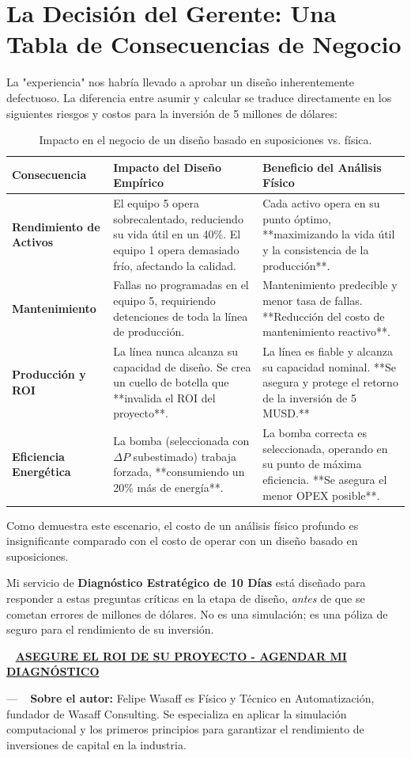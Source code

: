 \documentclass[11pt, a4paper,oneside]{article}
\begin{document}
\section{La Decisión del Gerente: Una Tabla de Consecuencias de Negocio}
La "experiencia" nos habría llevado a aprobar un diseño inherentemente defectuoso. La diferencia entre asumir y calcular se traduce directamente en los siguientes riesgos y costos para la inversión de 5 millones de dólares:

\begin{table}[h!]
    \centering
    \caption{Impacto en el negocio de un diseño basado en suposiciones vs. física.}
    \label{tab:consecuencias}
    \begin{tabular}{p{3.5cm} p{6cm} p{6cm}}
    \toprule
    \textbf{Consecuencia} & \textbf{Impacto del Diseño Empírico} & \textbf{Beneficio del Análisis Físico} \\
    \midrule
    \textbf{Rendimiento de Activos} & El equipo 5 opera sobrecalentado, reduciendo su vida útil en un 40\%. El equipo 1 opera demasiado frío, afectando la calidad. & Cada activo opera en su punto óptimo, **maximizando la vida útil y la consistencia de la producción**. \\
    \addlinespace
    \textbf{Mantenimiento} & Fallas no programadas en el equipo 5, requiriendo detenciones de toda la línea de producción. & Mantenimiento predecible y menor tasa de fallas. **Reducción del costo de mantenimiento reactivo**. \\
    \addlinespace
    \textbf{Producción y ROI} & La línea nunca alcanza su capacidad de diseño. Se crea un cuello de botella que **invalida el ROI del proyecto**. & La línea es fiable y alcanza su capacidad nominal. **Se asegura y protege el retorno de la inversión de 5 MUSD.** \\
    \addlinespace
    \textbf{Eficiencia Energética} & La bomba (seleccionada con $\Delta P$ subestimado) trabaja forzada, **consumiendo un 20\% más de energía**. & La bomba correcta es seleccionada, operando en su punto de máxima eficiencia. **Se asegura el menor OPEX posible**. \\
    \bottomrule
    \end{tabular}
\end{table}

\begin{ctabox}
    Como demuestra este escenario, el costo de un análisis físico profundo es insignificante comparado con el costo de operar con un diseño basado en suposiciones.
    
    Mi servicio de \textbf{Diagnóstico Estratégico de 10 Días} está diseñado para responder a estas preguntas críticas en la etapa de diseño, \textit{antes} de que se cometan errores de millones de dólares. No es una simulación; es una póliza de seguro para el rendimiento de su inversión.
    
    \
    \centering
    \href{https://www.wasaffconsulting.com/como-empezar}{\color{WasaffCopper} \large \textbf{ASEGURE EL ROI DE SU PROYECTO - AGENDAR MI DIAGNÓSTICO}}
\end{ctabox}

\vspace{2cm}
---
\
{\small
\textbf{Sobre el autor:} Felipe Wasaff es Físico y Técnico en Automatización, fundador de Wasaff Consulting. Se especializa en aplicar la simulación computacional y los primeros principios para garantizar el rendimiento de inversiones de capital en la industria.
}
\end{document}
